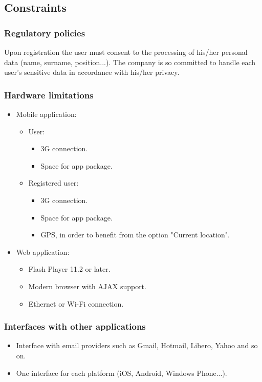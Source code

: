 \subsection{Constraints}
\subsubsection{Regulatory policies}
Upon registration the user must consent to the processing of his/her personal data (name, surname, position...). The company is so committed to handle each user's sensitive data in accordance with his/her privacy.
\subsubsection{Hardware limitations}
\begin{itemize}
	\item Mobile application:
	\begin{itemize}
		\item User:
		\begin{itemize}
			\item 3G connection.
			\item Space for app package.
		\end{itemize}
		\item Registered user:
		\begin{itemize}
			\item 3G connection.
			\item Space for app package.
			\item GPS, in order to benefit from the option "Current location".
		\end{itemize}
	\end{itemize}
	\item Web application:
	\begin{itemize}
		\item Flash Player 11.2 or later.
		\item Modern browser with AJAX support.
		\item Ethernet or Wi-Fi connection.
	\end{itemize}
\end{itemize}
\subsubsection{Interfaces with other applications}
\begin{itemize}
	\item Interface with email providers such as Gmail, Hotmail, Libero, Yahoo and so on.
	\item One interface for each platform (iOS, Android, Windows Phone...). 
\end{itemize}
